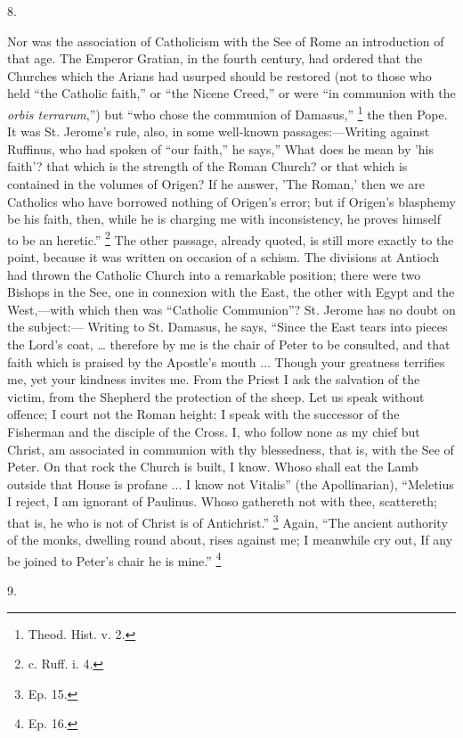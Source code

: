 8.

Nor was the association of Catholicism with the See of Rome an
introduction of that age. The Emperor Gratian, in the fourth century,
had ordered that the Churches which the Arians had usurped should be
restored (not to those who held ``the Catholic faith,'' or
``the Nicene Creed,'' or were ``in communion with the \emph{orbis
terrarum},'') but ``who chose the communion of Damasus,''
\footnote{Theod. Hist. v. 2.} the then Pope. It was
St. Jerome's rule, also, in some well-known passages:—Writing
against Ruffinus, who had spoken of ``our faith,'' he
says,'' What does he mean by 'his faith'? that which is the
strength of the Roman Church? or that which is contained in the
volumes of Origen? If he answer, 'The Roman,' then we are Catholics
who have borrowed nothing of Origen's error; but if Origen's blasphemy
be his faith, then, while he is charging me with inconsistency, he
proves himself to be an heretic.'' \footnote{c. Ruff. i. 4.} The other passage, already quoted, is still more exactly to
the point, because it was written on occasion of a schism. The
divisions at Antioch had thrown the Catholic Church into a remarkable
position; there were two Bishops in the See, one in connexion with the
East, the other with Egypt and the West,—with which then was
``Catholic Communion''? St. Jerome has no doubt on the
subject:— Writing to St. Damasus, he says, ``Since the East tears
into pieces the Lord's coat, … therefore by me is the chair of Peter
to be consulted, and that faith which is praised by the Apostle's
mouth ... Though your greatness terrifies me, yet your kindness
invites me. From the Priest I ask the salvation of the victim, from
the Shepherd the protection of the sheep. Let us speak without
offence; I court not the Roman height: I speak with the successor of
the Fisherman and the disciple of the Cross. I, who follow none as my
chief but Christ, am associated in communion with thy blessedness,
that is, with the See of Peter. On that rock the Church is built, I
know. Whoso shall eat the Lamb outside that House is profane ... I
know not Vitalis'' (the Apollinarian), ``Meletius I reject, I
am ignorant of Paulinus. Whoso gathereth not with thee, scattereth;
that is, he who is not of Christ is of Antichrist.'' \footnote{Ep. 15.} Again, ``The ancient authority of the monks, dwelling
round about, rises against me; I meanwhile cry out, If any be joined
to Peter's chair he is mine.'' \footnote{Ep. 16.}

9.

